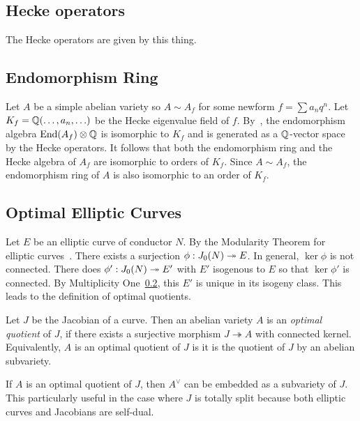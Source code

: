 \documentclass[11pt, proquest]{uwthesis}
\begin{document}
\subsection{Hecke operators}%
\label{sub:hecke_operators}

The Hecke operators are given by this thing.

\subsection{Endomorphism Ring}

Let $A$ be a simple abelian variety so $A\sim A_f$ for some newform $f=\sum
a_n q^n$. Let $K_f=\mathbb{Q}(\ldots,a_n,\ldots)$ be the Hecke eigenvalue field of
$f$. By~\cite[Prop. 7.14]{shimura:intro}, the endomorphism algebra
$\operatorname{End}(A_f)\otimes \mathbb{Q}$ is isomorphic to $K_f$ and is generated as a
$\mathbb{Q}$-vector space by the Hecke operators. It follows that both the
endomorphism ring and the Hecke algebra of $A_f$ are isomorphic to orders of
$K_f$. Since $A\sim A_f$, the endomorphism ring of $A$ is also isomorphic to an
order of $K_f$.


\subsection{Optimal Elliptic Curves}%
\label{sub:optimal_elliptic_curves}

Let $E$ be an elliptic curve of conductor $N$. By the Modularity Theorem for
elliptic curves~\cite{breuil-conrad-diamond-taylor}. There exists a surjection
$\phi:J_0(N)\twoheadrightarrow E$. In general, $\ker\phi$ is not connected. There does
$\phi':J_0(N)\twoheadrightarrow E'$ with $E'$ isogenous to $E$ so that $\ker\phi'$ is
connected. By Multiplicity One~\ref{}, this $E'$ is unique in its isogeny
class. This leads to the definition of optimal quotients.

\begin{definition}%
    \label{defn:optimal_quotient}
    Let $J$ be the Jacobian of a curve. Then an abelian variety $A$ is an
    \emph{optimal quotient} of $J$, if there exists a surjective morphism $J
    \twoheadrightarrow A$ with connected kernel. Equivalently, $A$ is an
    optimal quotient of $J$ is it is the quotient of $J$ by an abelian
    subvariety.
\end{definition}

If $A$ is an optimal quotient of $J$, then $A^\vee$ can be embedded as a
subvariety of $J$. This particularly useful in the case where $J$ is totally
split because both elliptic curves and Jacobians are self-dual.
\end{document}
